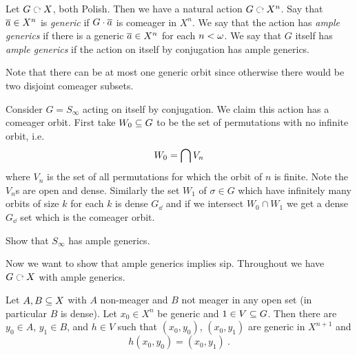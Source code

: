 \documentclass{amsart}
\begin{document}
\begin{defn}
Let $G\acts X$, both Polish. 
Then we have a natural action $G\acts X^n$.
Say that $\overline{a}\in X^n$ is \emph{generic} if $G\cdot \overline{a}$ is comeager in $X^n$.
We say that the action has \emph{ample generics} if there is a generic $\overline{a}\in X^n$ for
each $n<\omega$.
We say that $G$ itself has \emph{ample generics} if the action on itself by conjugation
has ample generics.
\end{defn}

Note that there can be at most one generic orbit since otherwise there would be two disjoint
comeager subsets.

\begin{exm}
Consider $G=S_\infty$ acting on itself by conjugation. 
We claim this action has a comeager orbit. 
First take $W_0 \subseteq G$ to be the set of permutations with no infinite orbit, i.e.
\begin{equation}
W_0 = \bigcap V_n
\end{equation}
where $V_n$ is the set of all permutations for which the orbit of $n$ is finite.
Note the $V_n$s are open and dense.
Similarly the set $W_1$ of $\sigma \in G$ which have infinitely many orbits of size $k$ for each
$k$ is dense $G_\dd$ and if we intersect $W_0\cap W_1$
we get a dense $G_\dd$ set which is the comeager orbit.
\end{exm}

\begin{exr}
Show that $S_\infty$ has ample generics.
\end{exr}

Now we want to show that ample generics implies sip.
Throughout we have
$G\acts X$ with ample generics. 

\begin{lem}
Let $A , B\subseteq X$ with $A$ non-meager and $B$ not meager in any open set
(in particular $B$ is dense). Let $x_0 \in X^n$ be generic and $1\in V\subseteq G$. 
Then there are $y_0\in A$, $y_1\in B$, and $h\in V$ such that $\left( x_0 , y_0 \right)$,
$\left( x_0 , y_1 \right)$ are generic in $X^{n+1}$ and
\begin{equation}
h\left( x_0 , y_0 \right) = \left( x_0 , y_1 \right) \ .
\end{equation}
\end{lem}
\end{document}
